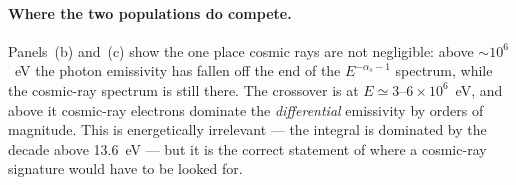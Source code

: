 \documentclass[11pt,a4paper]{article}
\begin{document}
\paragraph{Where the two populations do compete.}
Panels~(b) and~(c) show the one place cosmic rays are not negligible: above
$\sim10^{6}$~eV the photon emissivity has fallen off the end of the
$E^{-\alpha_s-1}$ spectrum, while the cosmic-ray spectrum is still there.  The
crossover is at $E\simeq3$--$6\times10^{6}$~eV, and above it cosmic-ray
electrons dominate the \emph{differential} emissivity by orders of magnitude.
This is energetically irrelevant --- the integral is dominated by the decade
above 13.6~eV --- but it is the correct statement of where a cosmic-ray
signature would have to be looked for.

\end{document}
